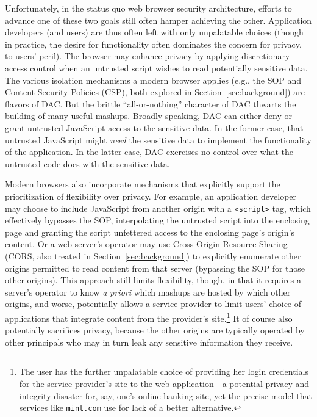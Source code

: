Unfortunately, in the status quo web browser security architecture,
efforts to advance one of these two goals still often hamper achieving
the other. Application developers (and users) are thus often left with
only unpalatable choices (though in practice, the desire for
functionality often dominates the concern for privacy, to users'
peril). The browser may enhance privacy by applying discretionary
access control when an untrusted script wishes to read
potentially sensitive data. The various isolation mechanisms a modern
browser applies (e.g., the SOP and Content Security Policies (CSP),
both explored in Section~\ref{sec:background}) are flavors of DAC. But
the brittle ``all-or-nothing'' character of DAC thwarts the building
of many useful mashups. Broadly speaking, DAC can either deny or grant
untrusted JavaScript access to the sensitive data. In the former case,
that untrusted JavaScript might {\em need} the sensitive data to
implement the functionality of the application. In the latter case,
DAC exercises no control over what the untrusted code does with the
sensitive data.

Modern browsers also incorporate mechanisms that explicitly support
the prioritization of flexibility over privacy. For example, an
application developer may choose to include JavaScript from another
origin with a {\tt <script>} tag, which effectively bypasses the SOP,
interpolating the untrusted script into the enclosing page and
granting the script unfettered access to the enclosing page's origin's
content. Or a web server's operator may use Cross-Origin Resource
Sharing (CORS, also treated in Section~\ref{sec:background}) to
explicitly enumerate other origins permitted to read content from that
server (bypassing the SOP for those other origins). This approach
still limits flexibility, though, in that it requires a server's
operator to know {\em a priori} which mashups are hosted by which
other origins, and worse, potentially allows a service provider to
limit users' choice of applications that integrate content from the
provider's site.\footnote{The user has the further unpalatable
  choice of providing her login credentials for the service
  provider's site to the web application---a potential
  privacy and integrity disaster for, say, one's online banking site,
  yet the precise model that services like {\tt mint.com} use for lack
  of a better alternative.} It of course also potentially sacrifices
privacy, because the other origins are typically operated by other
principals who may in turn leak any sensitive information they
receive.


